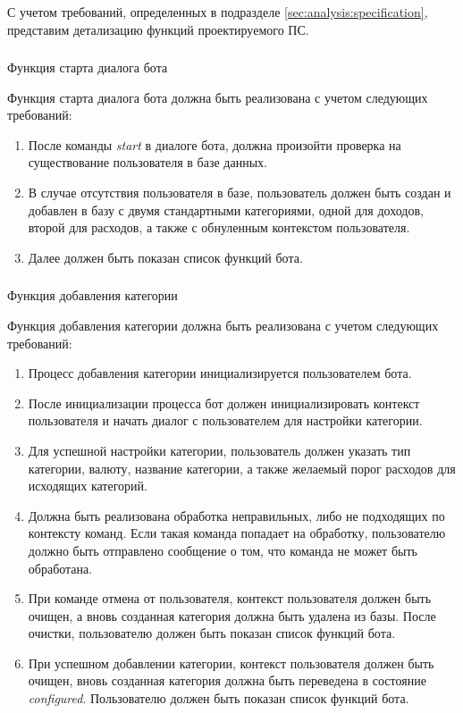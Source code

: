 С учетом требований, определенных в подразделе \ref{sec:analysis:specification}, представим детализацию функций проектируемого ПС.

\subsubsection{} Функция старта диалога бота
\label{sec:domain:specification:startdialog}

Функция старта диалога бота должна быть реализована с учетом следующих требований:

\begin{enumerate}
	\item После команды \emph{start} в диалоге бота, должна произойти проверка на существование пользователя в базе данных.
	\item В случае отсутствия пользователя в базе, пользователь должен быть создан и добавлен в базу с двумя стандартными категориями, одной для доходов, второй для расходов, а также с обнуленным контекстом пользователя.
	\item Далее должен быть показан список функций бота.
\end{enumerate}

\subsubsection{} Функция добавления категории
\label{sec:domain:specification:addcategory}

Функция добавления категории должна быть реализована с учетом следующих требований:

\begin{enumerate}
	\item Процесс добавления категории инициализируется пользователем бота.
	\item После инициализации процесса бот должен инициализировать контекст пользователя и начать диалог с пользователем для настройки категории.
	\item Для успешной настройки категории, пользователь должен указать тип категории, валюту, название категории, а также желаемый порог расходов для исходящих категорий.
	\item Должна быть реализована обработка неправильных, либо не подходящих по контексту команд. Если такая команда попадает на обработку, пользователю должно быть отправлено сообщение о том, что команда не может быть обработана.
	\item При команде отмена от пользователя, контекст пользователя должен быть очищен, а вновь созданная категория должна быть удалена из базы. После очистки, пользователю должен быть показан список функций бота.
	\item При успешном добавлении категории, контекст пользователя должен быть очищен, вновь созданная категория должна быть переведена в состояние \emph{configured}. Пользователю должен быть показан список функций бота.
\end{enumerate}

